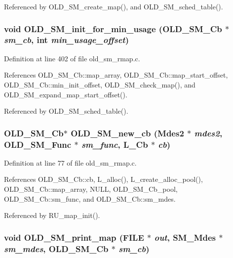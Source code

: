 Referenced by OLD\_\-SM\_\-create\_\-map(), and OLD\_\-SM\_\-sched\_\-table().
\subsubsection{\setlength{\rightskip}{0pt plus 5cm}void OLD\_\-SM\_\-init\_\-for\_\-min\_\-usage (\bf{OLD\_\-SM\_\-Cb} $\ast$ {\em sm\_\-cb}, int {\em min\_\-usage\_\-offset})}\label{old__sm__rmap_8c_694759c1c614a5d187e5ff67e22e9bb0}




Definition at line 402 of file old\_\-sm\_\-rmap.c.

References OLD\_\-SM\_\-Cb::map\_\-array, OLD\_\-SM\_\-Cb::map\_\-start\_\-offset, OLD\_\-SM\_\-Cb::min\_\-init\_\-offset, OLD\_\-SM\_\-check\_\-map(), and OLD\_\-SM\_\-expand\_\-map\_\-start\_\-offset().

Referenced by OLD\_\-SM\_\-sched\_\-table().
\subsubsection{\setlength{\rightskip}{0pt plus 5cm}\bf{OLD\_\-SM\_\-Cb}$\ast$ OLD\_\-SM\_\-new\_\-cb (Mdes2 $\ast$ {\em mdes2}, \bf{OLD\_\-SM\_\-Func} $\ast$ {\em sm\_\-func}, L\_\-Cb $\ast$ {\em cb})}\label{old__sm__rmap_8c_2a8e20d7b4bcc0db776ae4b6332a4b5d}




Definition at line 77 of file old\_\-sm\_\-rmap.c.

References OLD\_\-SM\_\-Cb::cb, L\_\-alloc(), L\_\-create\_\-alloc\_\-pool(), OLD\_\-SM\_\-Cb::map\_\-array, NULL, OLD\_\-SM\_\-Cb\_\-pool, OLD\_\-SM\_\-Cb::sm\_\-func, and OLD\_\-SM\_\-Cb::sm\_\-mdes.

Referenced by RU\_\-map\_\-init().
\subsubsection{\setlength{\rightskip}{0pt plus 5cm}void OLD\_\-SM\_\-print\_\-map (FILE $\ast$ {\em out}, SM\_\-Mdes $\ast$ {\em sm\_\-mdes}, \bf{OLD\_\-SM\_\-Cb} $\ast$ {\em sm\_\-cb})}\label{old__sm__rmap_8c_a21abe36de254eb267e395ef14dcd133}




